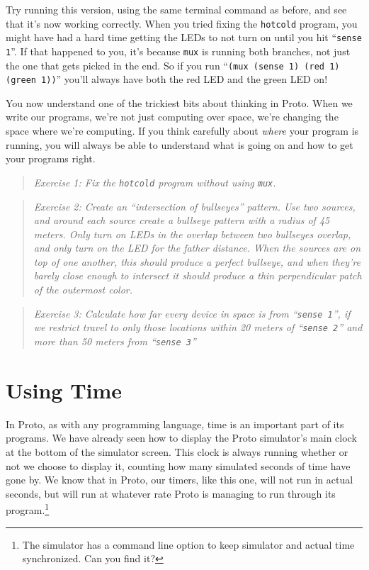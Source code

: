 \documentclass{article}
\newcommand\problem[1]{\begin{quote}{\em #1}\end{quote}}
\newcommand\var[1]{{\tt #1}}
\newcommand\qvar[1]{``{\tt #1}''}
\begin{document}
Try running this version, using the same terminal command as before,
and see that it's now working correctly.  When you tried fixing the
\var{hotcold} program, you might have had a hard time getting the LEDs
to not turn on until you hit \qvar{sense 1}.  If that happened to you,
it's because \var{mux} is running both branches, not just the one that
gets picked in the end.  So if you run \qvar{(mux (sense 1) (red 1)
  (green 1))} you'll always have both the red LED and the green LED
on!

You now understand one of the trickiest bits about thinking in Proto.
When we write our programs, we're not just computing over space, we're
changing the space where we're computing.  If you think carefully
about {\em where} your program is running, you will always be able to
understand what is going on and how to get your programs right.

\problem{Exercise 1: Fix the \var{hotcold} program without using \var{mux}.}

\problem{Exercise 2: Create an ``intersection of bullseyes'' pattern.
  Use two sources, and around each source create a bullseye pattern
  with a radius of 45 meters.  Only turn on LEDs in the overlap
  between two bullseyes overlap, and only turn on the LED for the
  father distance.  When the sources are on top of one another, this
  should produce a perfect bullseye, and when they're barely close
  enough to intersect it should produce a thin perpendicular patch of
  the outermost color.}

\problem{Exercise 3: Calculate how far every device in space is from
  \qvar{sense 1}, if we restrict travel to only those locations within
  20 meters of \qvar{sense 2} and more than 50 meters from \qvar{sense 3}}

\section{Using Time}

In Proto, as with any programming language, time is an important part
of its programs.  We have already seen how to display the Proto
simulator's main clock at the bottom of the simulator screen.  This
clock is always running whether or not we choose to display it,
counting how many simulated seconds of time have gone by.  We know
that in Proto, our timers, like this one, will not run in actual
seconds, but will run at whatever rate Proto is managing to run
through its program.\footnote{The simulator has a command line option
  to keep simulator and actual time synchronized.  Can you find it?}
\end{document}

